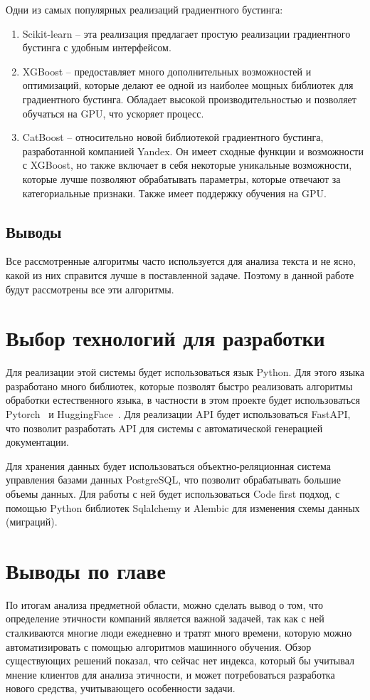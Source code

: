 \documentclass[PI, VKR]{HSEUniversity}
\begin{document}
Одни из самых популярных реализаций градиентного бустинга:
\begin{enumerate}
\item Scikit-learn -- эта реализация предлагает простую реализации градиентного бустинга с удобным интерфейсом.
\item XGBoost\autocite{chen_xgboost_2016} -- предоставляет много дополнительных возможностей и оптимизаций, которые делают ее одной из наиболее мощных библиотек для градиентного бустинга. Обладает высокой производительностью и позволяет обучаться на GPU\autocite{mitchell_accelerating_2017}, что ускоряет процесс.
\item CatBoost\autocite{prokhorenkova_catboost_2018} -- относительно новой библиотекой градиентного бустинга, разработанной компанией Yandex. Он имеет сходные функции и возможности с XGBoost, но также включает в себя некоторые уникальные возможности, которые лучше позволяют обрабатывать параметры, которые отвечают за категориальные признаки. Также имеет поддержку обучения на GPU\autocite{dorogush_catboost_2018}.
\end{enumerate}
\subsection{Выводы}
\label{sec:org4522e30}
Все рассмотренные алгоритмы часто используется для анализа текста и не ясно, какой из них справится лучше в поставленной задаче. Поэтому в данной работе будут рассмотрены все эти алгоритмы.
\section{Выбор технологий для разработки}
\label{sec:org41c58eb}
Для реализации этой системы будет использоваться язык Python\autocite{vanrossum_python_2009}. Для этого языка разработано много библиотек, которые позволят быстро реализовать алгоритмы обработки естественного языка, в частности в этом проекте будет использоваться Pytorch~\autocite{paszke_pytorch_2019} и HuggingFace~\autocite{wolf_transformers_2020}. Для реализации API будет использоваться FastAPI, что позволит разработать API для системы с автоматической генерацией документации.

Для хранения данных будет использоваться объектно-реляционная система управления базами данных PostgreSQL, что позволит обрабатывать большие объемы данных. Для работы с ней будет использоваться Code first подход, с помощью Python библиотек Sqlalchemy и Alembic для изменения схемы данных (миграций).
\section{Выводы по главе}
\label{sec:org17aeca2}
По итогам анализа предметной области, можно сделать вывод о том, что определение этичности компаний является важной задачей, так как с ней сталкиваются многие люди ежедневно и тратят много времени, которую можно автоматизировать с помощью алгоритмов машинного обучения. Обзор существующих решений показал, что сейчас нет индекса, который бы учитывал мнение клиентов для анализа этичности, и может потребоваться разработка нового средства, учитывающего особенности задачи.
\end{document}
